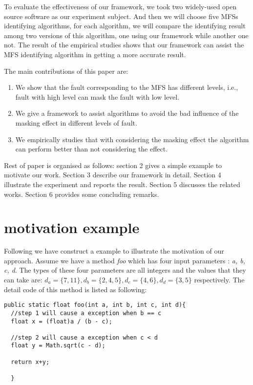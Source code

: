 \documentclass{sig-alternate}
\begin{document}
To evaluate the effectiveness of our framework, we took two widely-used open source software as our experiment subject. And then we will choose five MFSs identifying  algorithms, for each algorithm, we will compare the identifying result among two versions of this algorithm, one using our framework while another one not. The result of the empirical studies shows that our framework can assist the MFS identifying algorithm in getting a more accurate result.

The main contributions of this paper are:
\begin{enumerate}
 \item We show that the fault corresponding to the MFS has different levels, i.e., fault with high level can mask the fault with low level.
 \item We give a framework to assist algorithms to avoid the bad influence of the masking effect in different levels of fault.
 \item We empirically studies that with considering the masking effect the algorithm can perform better than not considering the effect.

\end{enumerate}

Rest of paper is organised as follows:
section 2 gives a simple example to motivate our work. Section 3 describe our framework in detail. Section 4 illustrate the experiment and reports the result. Section 5 discusses the related works. Section 6 provides some concluding remarks.

\section{motivation example}

Following we have construct a example to illustrate the motivation of our approach. Assume we have a method \emph{foo} which has four input parameters : \emph{a, b, c, d}. The types of these four parameters are all integers and the values that they can take are: $d_{a} = \{7, 11\}, d_{b} = \{2, 4, 5\}, d_{c} = \{4, 6\}, d_{d} = \{3, 5\}$ respectively.  The detail code of this method is listed as following:

\begin{verbatim}
public static float foo(int a, int b, int c, int d){
  //step 1 will cause a exception when b == c
  float x = (float)a / (b - c);

  //step 2 will cause a exception when c < d
  float y = Math.sqrt(c - d);

  return x+y;

  }
\end{verbatim}
\end{document}

